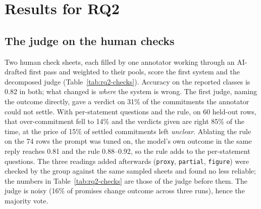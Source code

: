 \documentclass[11pt]{article}
\begin{document}
\section{Results for RQ2}
\label{sec:rq2}

\subsection{The judge on the human checks}
\label{sec:rq2-judge}
Two human check sheets, each filled by one annotator working through an AI-drafted first pass and weighted to their pools, score the first system and the decomposed judge (Table~\ref{tab:rq2-checks}). Accuracy on the reported classes is 0.82 in both; what changed is \emph{where} the system is wrong. The first judge, naming the outcome directly, gave a verdict on 31\% of the commitments the annotator could not settle. With per-statement questions and the rule, on 60 held-out rows, that over-commitment fell to 14\% and the verdicts given are right 85\% of the time, at the price of 15\% of settled commitments left \emph{unclear}. Ablating the rule on the 74 rows the prompt was tuned on, the model's own outcome in the same reply reaches 0.81 and the rule 0.88--0.92, so the rule adds to the per-statement questions. The three readings added afterwards (\texttt{proxy}, \texttt{partial}, \texttt{figure}) were checked by the group against the same sampled sheets and found no less reliable; the numbers in Table~\ref{tab:rq2-checks} are those of the judge before them. The judge is noisy (16\% of promises change outcome across three runs), hence the majority vote.
\end{document}
